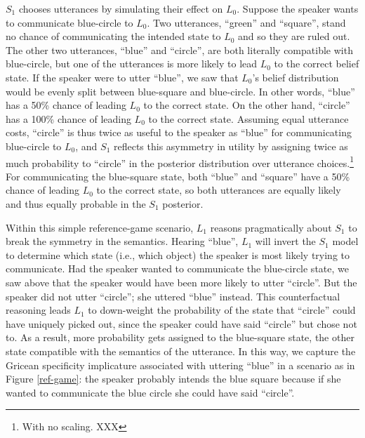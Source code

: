 \documentclass{sp}
\begin{document}
$S_1$ chooses utterances by simulating their effect on $L_0$. Suppose the speaker wants to communicate blue-circle to $L_0$. Two utterances, ``green'' and ``square'', stand no chance of communicating the intended state to $L_0$ and so they are ruled out. The other two utterances, ``blue'' and ``circle'', are both literally compatible with blue-circle, but one of the utterances is more likely to lead $L_0$ to the correct belief state. If the speaker were to utter ``blue'', we saw that $L_0$'s belief distribution would be evenly split between blue-square and blue-circle. In other words, ``blue'' has a 50\% chance of leading $L_0$ to the correct state. On the other hand, ``circle'' has a 100\% chance of leading $L_0$ to the correct state. Assuming equal utterance costs, ``circle'' is thus twice as useful to the speaker as ``blue'' for communicating blue-circle to $L_0$, and $S_1$ reflects this asymmetry in utility by assigning twice as much probability to ``circle'' in the posterior distribution over utterance choices.\footnote{With no scaling. XXX} For communicating the blue-square state, both ``blue'' and ``square'' have a 50\% chance of leading $L_0$ to the correct state, so both utterances are equally likely and thus equally probable in the $S_1$ posterior.

Within this simple reference-game scenario, $L_1$ reasons pragmatically about $S_1$ to break the symmetry in the semantics. Hearing ``blue'', $L_1$ will invert the $S_1$ model to determine which state (i.e., which object) the speaker is most likely trying to communicate. Had the speaker wanted to communicate the blue-circle state, we saw above that the speaker would have been more likely to utter ``circle''. But the speaker did not utter ``circle''; she uttered ``blue'' instead. This counterfactual reasoning leads $L_1$ to down-weight the probability of the state that ``circle'' could have uniquely picked out, since the speaker could have said ``circle'' but chose not to. As a result, more probability gets assigned to the blue-square state, the other state compatible with the semantics of the utterance. In this way, we capture the Gricean specificity implicature associated with uttering ``blue'' in a scenario as in Figure \ref{ref-game}: the speaker probably intends the blue square because if she wanted to communicate the blue circle she could have said ``circle''.
\end{document}
